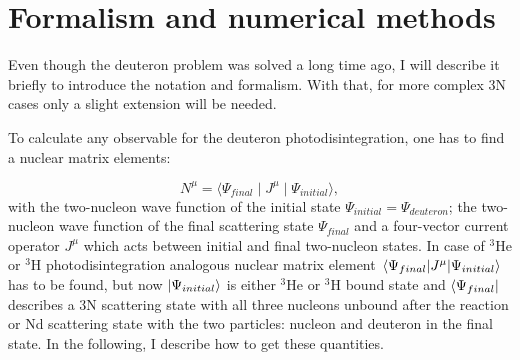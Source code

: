 \chapter{Formalism and numerical methods}
\label{sec:formalism}

Even though the deuteron problem was solved a long time ago, I will describe it briefly 
to introduce the notation and formalism. 
With that, for more complex 3N cases only a slight 
extension will be needed.

To calculate any observable for the deuteron photodisintegration,
one has to find a nuclear matrix elements:

\begin{equation}
    N^\mu = \langle \Psi_{final} \mid J^\mu \mid \Psi_{initial} \rangle, 
    \label{main}
\end{equation}
with the two-nucleon wave function of the initial state $\Psi_{initial}  = \Psi_{deuteron}$;
the two-nucleon wave function of the final scattering state $\Psi_{final}$ 
and a four-vector current operator $J^\mu$ which acts between initial and final 
two-nucleon states. 
In case of $^3$He or $^3$H photodisintegration analogous nuclear matrix element
$\matrixel{\Psi_{final}} {J^\mu} {\Psi_{initial}}$ has to be found, but now 
$\ket{\Psi_{initial}}$ is either $^3$He or $^3$H bound state and $\bra{\Psi_{final}}$
describes a 3N scattering state with all three nucleons unbound after the reaction
or Nd scattering state with the two particles: nucleon and deuteron in the final state.
In the following, I describe how to get these quantities.




